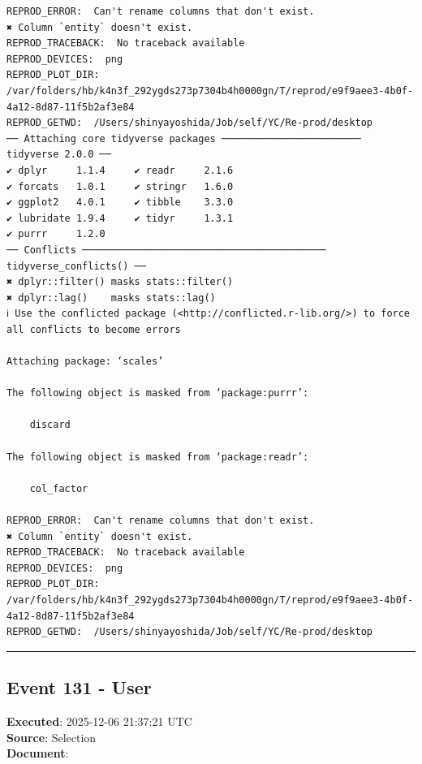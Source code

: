 \documentclass[
  11pt,
]{article}
\newenvironment{rpoutput}{\vspace{0.5em}\begin{snugshade}}{\end{snugshade}}
\begin{document}
\begin{rpoutput}

\begin{verbatim}
REPROD_ERROR:  Can't rename columns that don't exist.
✖ Column `entity` doesn't exist. 
REPROD_TRACEBACK:  No traceback available  
REPROD_DEVICES:  png 
REPROD_PLOT_DIR:  /var/folders/hb/k4n3f_292ygds273p7304b4h0000gn/T/reprod/e9f9aee3-4b0f-4a12-8d87-11f5b2af3e84 
REPROD_GETWD:  /Users/shinyayoshida/Job/self/YC/Re-prod/desktop 
── Attaching core tidyverse packages ──────────────────────── tidyverse 2.0.0 ──
✔ dplyr     1.1.4     ✔ readr     2.1.6
✔ forcats   1.0.1     ✔ stringr   1.6.0
✔ ggplot2   4.0.1     ✔ tibble    3.3.0
✔ lubridate 1.9.4     ✔ tidyr     1.3.1
✔ purrr     1.2.0     
── Conflicts ────────────────────────────────────────── tidyverse_conflicts() ──
✖ dplyr::filter() masks stats::filter()
✖ dplyr::lag()    masks stats::lag()
ℹ Use the conflicted package (<http://conflicted.r-lib.org/>) to force all conflicts to become errors

Attaching package: ‘scales’

The following object is masked from ‘package:purrr’:

    discard

The following object is masked from ‘package:readr’:

    col_factor

REPROD_ERROR:  Can't rename columns that don't exist.
✖ Column `entity` doesn't exist. 
REPROD_TRACEBACK:  No traceback available  
REPROD_DEVICES:  png 
REPROD_PLOT_DIR:  /var/folders/hb/k4n3f_292ygds273p7304b4h0000gn/T/reprod/e9f9aee3-4b0f-4a12-8d87-11f5b2af3e84 
REPROD_GETWD:  /Users/shinyayoshida/Job/self/YC/Re-prod/desktop 
\end{verbatim}

\end{rpoutput}

\begin{center}\rule{0.5\linewidth}{0.5pt}\end{center}

\subsection{Event 131 - User}\label{event-131---user}

\textbf{Executed}: 2025-12-06 21:37:21 UTC\\
\textbf{Source}: Selection\\
\textbf{Document}:
\end{document}
